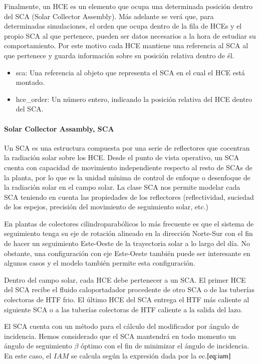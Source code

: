 \documentclass[12pt]{report} %
\begin{document}
Finalmente, un HCE es un elemento que ocupa una determinada posición dentro del SCA (Solar Collector Assembly). Más adelante se verá que, para determinadas simulaciones, el orden que ocupa dentro de la fila de HCEs y el propio SCA al que pertenece, pueden ser datos necesarios a la hora de estudiar su comportamiento. Por este motivo cada HCE mantiene una referencia al SCA al que pertenece y guarda información sobre su posición relativa dentro de él. 
\begin{itemize}
\item
  sca: Una referencia al objeto que representa el SCA en el cual el HCE
  está montado.
\item
  hce\_order: Un número entero, indicando la posición relativa del HCE
  dentro del SCA.
\end{itemize}

\hypertarget{solar-collector-assambly-sca}{%
\paragraph{Solar Collector Assambly,
SCA}\label{solar-collector-assambly-sca}}

Un SCA es una estructura compuesta por una serie de reflectores que cocentran la radiación solar sobre los HCE. Desde el punto de vista operativo, un SCA cuenta con capacidad de movimiento independiente respecto al resto de SCAs de la planta, por lo que es la unidad mínima de control de enfoque o desenfoque de la radiación solar en el campo solar. La clase SCA nos permite modelar cada SCA teniendo en cuenta las propiedades de los reflectores (reflectividad, suciedad de los espejos, precisión del movimiento de seguimiento solar, etc.)

En plantas de colectores cilindroparabólicos lo más frecuente es que el sistema de seguimiento tenga su eje de rotación alineado en la dirección Norte-Sur con el fin de hacer un seguimiento Este-Oeste de la trayectoria solar a lo largo del día. No obstante, una configuración con eje Este-Oeste también puede ser interesante en algunos casos y el modelo también permite esta configuración.

Dentro del campo solar, cada HCE debe pertenecer a un SCA. El primer HCE del SCA recibe el fluido caloportadador procedente de otro SCA o de las tuberías colectoras de HTF frio. El último HCE del SCA entrega el HTF más caliente al siguiente SCA o a las tuberías colectoras de HTF caliente a la salida del lazo.

El SCA cuenta con un método para el cálculo del modificador por ángulo de incidencia. Hemos considerado que el SCA mantendrá en todo momento un ángulo de seguimiento \(\beta\) óptimo con el fin de minimizar el ángulo de incidencia. En este caso, el \(IAM\) se calcula según la expresión dada por la ec.\(\eqref{eq:iam}\)
\end{document}
